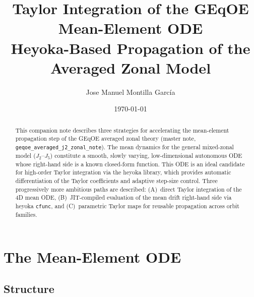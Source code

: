 \documentclass[11pt]{article}
\title{Taylor Integration of the GEqOE Mean-Element ODE\\
\large Heyoka-Based Propagation of the Averaged Zonal Model}
\author{Jose Manuel Montilla Garc\'ia}
\date{\today}
\newcommand{\master}{geqoe\_averaged\_j2\_zonal\_note}
\begin{document}
\maketitle

\begin{abstract}
This companion note describes three strategies for accelerating the
mean-element propagation step of the GEqOE averaged zonal theory (master
note, \texttt{\master{}}). The mean dynamics for the general mixed-zonal
model ($J_2$--$J_5$) constitute a smooth, slowly varying, low-dimensional
autonomous ODE whose right-hand side is a known closed-form function. This
ODE is an ideal candidate for high-order Taylor integration via the heyoka
library, which provides automatic differentiation of the Taylor coefficients
and adaptive step-size control. Three progressively more ambitious paths are
described: (A)~direct Taylor integration of the 4D mean ODE,
(B)~JIT-compiled evaluation of the mean drift right-hand side via heyoka
\texttt{cfunc}, and (C)~parametric Taylor maps for reusable propagation
across orbit families.
\end{abstract}

\tableofcontents

\section{The Mean-Element ODE}

\subsection{Structure}
\end{document}

